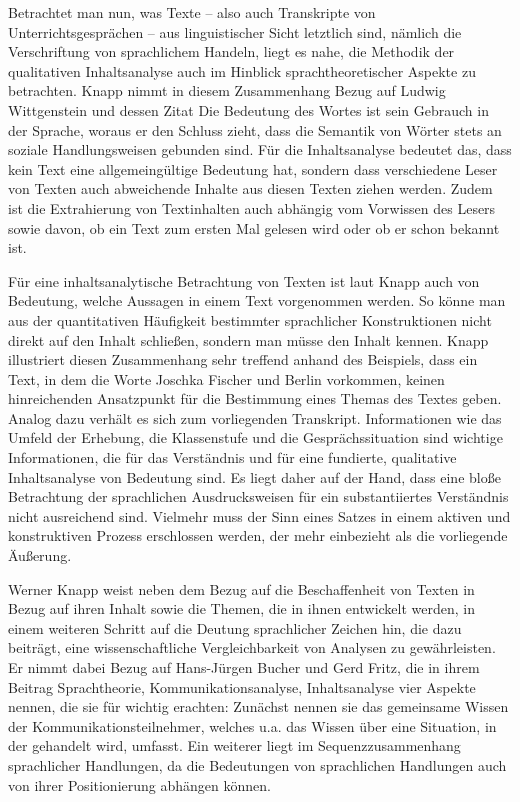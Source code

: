 Betrachtet man nun, was Texte -- also auch Transkripte von Unterrichtsgesprächen -- aus linguistischer Sicht letztlich sind, nämlich die Verschriftung von sprachlichem Handeln, liegt es nahe, die Methodik der qualitativen Inhaltsanalyse auch im Hinblick sprachtheoretischer Aspekte zu betrachten. 
Knapp nimmt in diesem Zusammenhang Bezug auf Ludwig Wittgenstein und dessen Zitat \glqq Die Bedeutung des Wortes ist sein Gebrauch in der Sprache\grqq{}\cite[S.\,21]{LW07}, woraus er den Schluss zieht, dass die Semantik von Wörter stets an soziale Handlungsweisen gebunden sind. 
Für die Inhaltsanalyse bedeutet das, dass kein Text eine allgemeingültige Bedeutung hat, sondern dass verschiedene Leser von Texten auch abweichende Inhalte aus diesen Texten ziehen werden.  
Zudem ist die Extrahierung von Textinhalten auch abhängig vom Vorwissen des Lesers sowie davon, ob ein Text zum ersten Mal gelesen wird oder ob er schon bekannt ist\cite[S.\,22]{WK07}.

Für eine inhaltsanalytische Betrachtung von Texten ist laut Knapp auch von Bedeutung, welche Aussagen in einem Text vorgenommen werden. 
So könne man aus der quantitativen Häufigkeit bestimmter sprachlicher Konstruktionen nicht direkt auf den Inhalt schließen, sondern man müsse den Inhalt kennen. 
Knapp illustriert diesen Zusammenhang sehr treffend anhand des Beispiels, dass ein Text, in dem die Worte \glqq Joschka Fischer\grqq{} und Berlin vorkommen, keinen hinreichenden Ansatzpunkt für die Bestimmung eines Themas des Textes geben. 
Analog dazu verhält es sich zum vorliegenden Transkript. 
Informationen wie das Umfeld der Erhebung, die Klassenstufe und die Gesprächssituation sind wichtige Informationen, die für das Verständnis und für eine fundierte, qualitative Inhaltsanalyse von Bedeutung sind. 
Es liegt daher auf der Hand, dass eine bloße Betrachtung der sprachlichen Ausdrucksweisen für ein substantiiertes Verständnis nicht ausreichend sind. 
Vielmehr muss der Sinn eines Satzes \glqq in einem aktiven und konstruktiven Prozess erschlossen werden, der mehr einbezieht als die vorliegende Äußerung.\grqq{}\cite[S.\,28]{WK07}

Werner Knapp weist neben dem Bezug auf die Beschaffenheit von Texten in Bezug auf ihren Inhalt sowie die Themen, die in ihnen entwickelt werden, in einem weiteren Schritt auf die Deutung sprachlicher Zeichen hin, die dazu beiträgt, eine wissenschaftliche Vergleichbarkeit von Analysen zu gewährleisten. 
Er nimmt dabei Bezug auf Hans-Jürgen Bucher  und Gerd Fritz, die in ihrem Beitrag \glqq Sprachtheorie, Kommunikationsanalyse, Inhaltsanalyse\grqq{} vier Aspekte nennen, die sie für wichtig erachten: 
Zunächst nennen sie das gemeinsame Wissen der Kommunikationsteilnehmer, welches u.a. das Wissen über eine Situation, in der gehandelt wird, umfasst. 
Ein weiterer liegt im Sequenzzusammenhang sprachlicher Handlungen, da die Bedeutungen von sprachlichen Handlungen auch von ihrer Positionierung abhängen können. 

